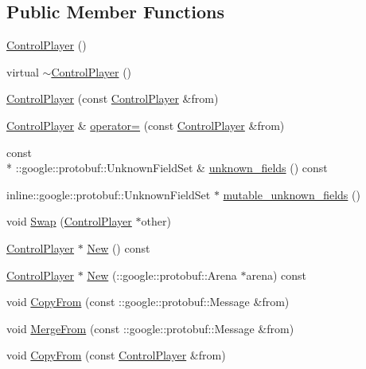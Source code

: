 \subsection*{Public Member Functions}
\begin{DoxyCompactItemize}
\item 
\hyperlink{class_control_player_acb5691c99fdae81465a0fe3e60c15a3d}{Control\-Player} ()
\item 
virtual \hyperlink{class_control_player_a27ea6029466effe1eb2a39eb3cb90da1}{$\sim$\-Control\-Player} ()
\item 
\hyperlink{class_control_player_a4773258dff369c3e618f22915b1ed13c}{Control\-Player} (const \hyperlink{class_control_player}{Control\-Player} \&from)
\item 
\hyperlink{class_control_player}{Control\-Player} \& \hyperlink{class_control_player_a1b20164c45224aebee88352c86399be7}{operator=} (const \hyperlink{class_control_player}{Control\-Player} \&from)
\item 
const \\*
\-::google\-::protobuf\-::\-Unknown\-Field\-Set \& \hyperlink{class_control_player_ae234e293c6d038e29ac6b84d5fa51130}{unknown\-\_\-fields} () const 
\item 
inline\-::google\-::protobuf\-::\-Unknown\-Field\-Set $\ast$ \hyperlink{class_control_player_a23294302f5acd784da03d52c49a2c058}{mutable\-\_\-unknown\-\_\-fields} ()
\item 
void \hyperlink{class_control_player_a31c6357a93fa21c6739f93bb34c17f78}{Swap} (\hyperlink{class_control_player}{Control\-Player} $\ast$other)
\item 
\hyperlink{class_control_player}{Control\-Player} $\ast$ \hyperlink{class_control_player_af57ac2d2518b280356cf9d97fe9d7715}{New} () const 
\item 
\hyperlink{class_control_player}{Control\-Player} $\ast$ \hyperlink{class_control_player_a693bcd1bbe06f676166d5a39331cc198}{New} (\-::google\-::protobuf\-::\-Arena $\ast$arena) const 
\item 
void \hyperlink{class_control_player_a10ddf43b10f0fc2578bd5ca37d426ed2}{Copy\-From} (const \-::google\-::protobuf\-::\-Message \&from)
\item 
void \hyperlink{class_control_player_ae2e6bf23c72d1c1fafdb4069a0c85616}{Merge\-From} (const \-::google\-::protobuf\-::\-Message \&from)
\item 
void \hyperlink{class_control_player_a3c2ca9aebf93722e016221c52b733e3b}{Copy\-From} (const \hyperlink{class_control_player}{Control\-Player} \&from)

\end{DoxyCompactItemize}
